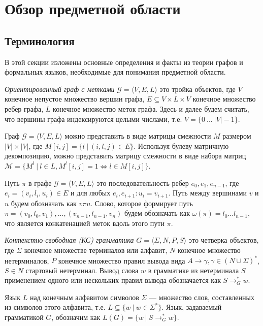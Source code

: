 \section{Обзор предметной области}

\subsection{Терминология}

В этой секции изложены основные определения и факты из теории графов и формальных языков, необходимые для понимания предметной области. 
    
\textit{Ориентированный граф с метками} $\mathcal{G} = \langle V, E, L \rangle$ это тройка объектов, где $V$ конечное непустое множество вершин графа, $E \subseteq V \times L \times V$ конечное множество ребер графа, $L$ конечное множество меток графа. Здесь и далее будем считать, что вершины графа индексируются целыми числами, т.е. $V = \{0~...~|V| - 1\}$.

Граф $\mathcal{G} = \langle V, E, L \rangle$ можно представить в виде матрицы смежности $M$ размером $|V| \times |V|$, где $M[i,j] = \{l~|~(i,l,j) \in E\}$. Используя булеву матричную декомпозицию, можно представить матрицу смежности в виде набора матриц $\mathcal{M} = \{ M^l ~|~ l \in L, M^l[i,j] = 1 \iff l \in M[i,j]\}$.

Путь $\pi$ в графе $\mathcal{G} = \langle V, E, L \rangle$ это последовательность ребер $e_0,e_1,e_{n-1}$, где $e_i = (v_i, l_i, u_i) \in E$ и для любых $e_i, e_{i+1}: u_i = v_{i+1}$. Путь между вершинами $v$ и $u$ будем обозначать как $v \pi u$. Слово, которое формирует путь $\pi = (v_0, l_0, v_1), ... ,(v_{n-1}, l_{n-1}, v_n)$ будем обозначать как $\omega (\pi) = l_0 ... l_{n-1}$, что является конкатенацией меток вдоль этого пути $\pi$.

\textit{Контекстно-свободная (КС) грамматика} $G = \langle \Sigma, N, P, S \rangle$ это четверка объектов, где $\Sigma$ конечное множестве терминалов или алфавит, $N$ конечное множество нетерминалов, $P$ конечное множество правил вывода вида $A \rightarrow \gamma, \gamma \in (N \cup \Sigma)^*$, $S \in N$ стартовый нетерминал. Вывод слова $w$ в грамматике из нетерминала $S$ применением одного или нескольких правил вывода обозначается как $S \rightarrow^*_G w$.

Язык $L$ над конечным алфавитом символов $\Sigma$ --- множество слов, составленных из символов этого алфавита, т.е. $L \subseteq \{w~|~w \in \Sigma ^*\}$. Язык, задаваемый грамматикой $G$, обозначим как $L(G) = \{w~|~S \rightarrow^*_G w\}$.

